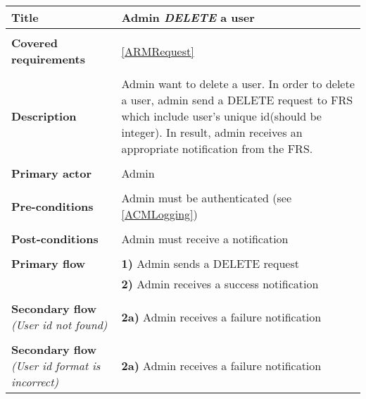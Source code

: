 \documentclass[a4paper,11pt]{article}
\begin{document}
\begin{tabular}{|p{3.5cm}|p{11.5cm}|} \hline
    \textbf{Title} &   Admin \emph{DELETE} a user

    \\ \hline \rowcolor{Gray} & \\ \hline

    \textbf{Covered requirements} &  \ref{ARMRequest}

    \\ \hline \rowcolor{Gray} & \\ \hline

    \textbf{Description} &  Admin want to delete a user. In order to delete a user, admin send a DELETE request to FRS which include user's unique id(should be integer). In result, admin receives an appropriate notification from the FRS.

    \\ \hline \rowcolor{Gray} & \\ \hline

    \textbf{Primary actor} & Admin

    \\ \hline \rowcolor{Gray} & \\ \hline

    \textbf{Pre-conditions} &   Admin must be authenticated (see \ref{ACMLogging})

    \\ \hline \rowcolor{Gray} & \\ \hline

    \textbf{Post-conditions} &   Admin must receive a notification
        
    \\ \hline \rowcolor{Gray} & \\ \hline 
         
    \textbf{Primary flow} &
    \textbf{1)} Admin sends a DELETE request \\&
    \textbf{2)} Admin receives a success notification
        
    \\ \hline \rowcolor{Gray} & \\ \hline 
         
    \textbf{Secondary flow} \emph{(User id not found)} & 
    \textbf{2a)} Admin receives a failure notification
     
    \\ \hline \rowcolor{Gray} & \\ \hline 
     
    \textbf{Secondary flow} \emph{(User id format is incorrect)} & 
    \textbf{2a)} Admin receives a failure notification
    
    \\ \hline 
\end{tabular}
\end{document}
